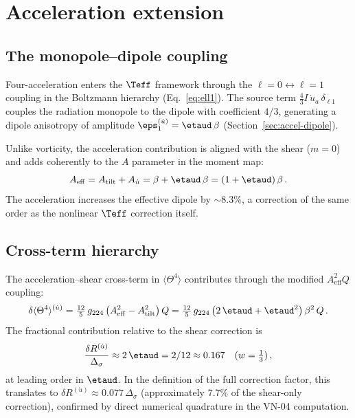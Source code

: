 \section{Acceleration extension}\label{sec:teff-accel}

\subsection{The monopole--dipole coupling}\label{sec:mono-dip}

Four-acceleration enters the $\Teff$ framework through the
$\ell = 0 \leftrightarrow \ell = 1$ coupling in the Boltzmann
hierarchy (Eq.~\eqref{eq:ell1}).  The source term
$\frac{4}{3}I\,\dot{u}_a\,\delta_{\ell 1}$ couples the
radiation monopole to the dipole with coefficient $4/3$,
generating a dipole anisotropy of amplitude
$\eps_1^{(\dot{u})} = \etaud\,\beta$
(Section~\ref{sec:accel-dipole}).

Unlike vorticity, the acceleration contribution is aligned with
the shear ($m = 0$) and adds coherently to the $A$ parameter in
the moment map:
\begin{equation}\label{eq:A-eff}
A_{\mathrm{eff}} = A_{\mathrm{tilt}} + A_{\dot{u}}
= \beta + \etaud\,\beta = (1 + \etaud)\,\beta\,.
\end{equation}
The acceleration increases the effective dipole by
$\sim 8.3\%$, a correction of the same order as the nonlinear
$\Teff$ correction itself.


\subsection{Cross-term hierarchy}\label{sec:cross-terms}

The acceleration--shear cross-term in $\langle\Theta^4\rangle$
contributes through the modified $A_{\mathrm{eff}}^2 Q$ coupling:
\begin{equation}
\delta\langle\Theta^4\rangle^{(\dot{u})}
= \tfrac{12}{5}\,g_{224}\,
  \bigl(A_{\mathrm{eff}}^2 - A_{\mathrm{tilt}}^2\bigr)\,Q
= \tfrac{12}{5}\,g_{224}\,
  \bigl(2\,\etaud + \etaud^2\bigr)\,\beta^2\,Q\,.
\end{equation}
The fractional contribution relative to the shear correction is
\begin{equation}
\frac{\delta R^{(\dot{u})}}{\Delta_\sigma}
\approx 2\,\etaud = 2/12 \approx 0.167
\quad (w = \tfrac{1}{3})\,,
\end{equation}
at leading order in $\etaud$.  In the definition of the full
correction factor, this translates to
$\delta R^{(\dot{u})} \approx 0.077\,\Delta_\sigma$
(approximately 7.7\% of the shear-only correction), confirmed by
direct numerical quadrature in the VN-04 computation.


